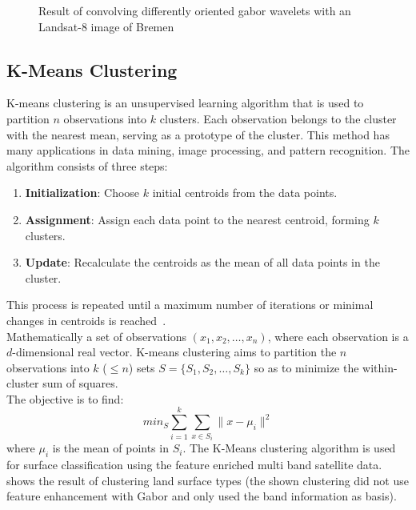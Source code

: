 \documentclass[12pt,a4paper, english]{article}
\begin{document}
\begin{figure}[!htbp]
\begin{subfigure}[b]{0.45\textwidth}
         \label{fig:feat06}
     \end{subfigure}
        \caption{Result of convolving differently oriented gabor wavelets with an Landsat-8 image of Bremen}\label{fig:gaborExample}
    \end{figure}

%
\newpage
  \subsection{K-Means Clustering}\label{sec:kmeans}
    K-means clustering is an unsupervised learning algorithm that is used to partition $n$ observations into $k$ clusters. 
    Each observation belongs to the cluster with the nearest mean, serving as a prototype of the cluster. 
    This method has many applications in data mining, image processing, and pattern recognition.
    The algorithm consists of three steps:
    \begin{enumerate}
        \item \textbf{Initialization}: Choose $k$ initial centroids from the data points.
        \item \textbf{Assignment}: Assign each data point to the nearest centroid, forming $k$ clusters.
        \item \textbf{Update}: Recalculate the centroids as the mean of all data points in the cluster. 
    \end{enumerate}
    This process is repeated until a maximum number of iterations or minimal changes in centroids is reached~\autocite{Sinaga2020}.\\ %
    Mathematically a set of observations $(x_1, x_2, \ldots, x_n)$, where each observation is a $d$-dimensional real vector.
    K-means clustering aims to partition the $n$ observations into $k$ ($\leq n$) sets $S = \{S_1, S_2, \ldots, S_k\}$ so as to minimize the within-cluster sum of squares. \\
    The objective is to find:
    \begin{equation}
        min_{S} \sum_{i=1}^{k} \sum_{x \in S_i} \| x - \mu_i \|^2
    \end{equation}
    where $\mu_i$ is the mean of points in $S_i$.
    The K-Means clustering algorithm is used for surface classification using the feature enriched multi band satellite data.
     shows the result of clustering land surface types (the shown clustering did not use feature enhancement with Gabor and only used the band information as basis).%
\end{document}
